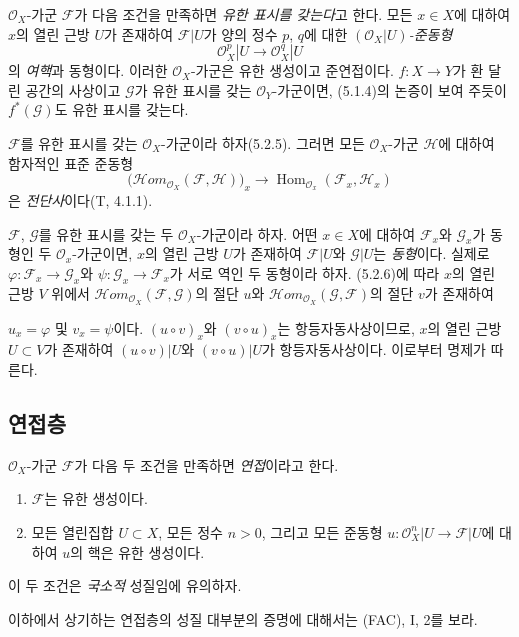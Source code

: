 \begin{env}[5.2.5]
\label{0.5.2.5-ko}
$\mathcal O_X$-가군 $\mathcal F$가 다음 조건을 만족하면
\emph{유한 표시를 갖는다}고 한다. 모든 $x\in X$에 대하여 $x$의
열린 근방 $U$가 존재하여 $\mathcal F|U$가 양의 정수 $p$, $q$에 대한
\emph{$(\mathcal O_X|U)$-준동형}
\[
  \mathcal O_X^p|U\longrightarrow\mathcal O_X^q|U
\]
의 \emph{여핵}과 동형이다. 이러한 $\mathcal O_X$-가군은 유한
생성이고 준연접이다. $f:X\to Y$가 환 달린 공간의 사상이고
$\mathcal G$가 유한 표시를 갖는 $\mathcal O_Y$-가군이면,
(5.1.4)의 논증이 보여 주듯이 $f^*(\mathcal G)$도 유한 표시를 갖는다.
\end{env}

\begin{env}[5.2.6]
\label{0.5.2.6-ko}
$\mathcal F$를 유한 표시를 갖는 $\mathcal O_X$-가군이라 하자(5.2.5).
그러면 모든 $\mathcal O_X$-가군 $\mathcal H$에 대하여 함자적인 표준
준동형
\[
  \bigl(\mathcal H\!om_{\mathcal O_X}(\mathcal F,\mathcal H)\bigr)_x
  \longrightarrow
  \operatorname{Hom}_{\mathcal O_x}(\mathcal F_x,\mathcal H_x)
\]
은 \emph{전단사}이다(T, 4.1.1).
\end{env}

\begin{env}[5.2.7]
\label{0.5.2.7-ko}
$\mathcal F$, $\mathcal G$를 유한 표시를 갖는 두
$\mathcal O_X$-가군이라 하자. 어떤 $x\in X$에 대하여
$\mathcal F_x$와 $\mathcal G_x$가 동형인 두 $\mathcal O_x$-가군이면,
$x$의 열린 근방 $U$가 존재하여 $\mathcal F|U$와 $\mathcal G|U$는
\emph{동형}이다. 실제로
$\varphi:\mathcal F_x\to\mathcal G_x$와
$\psi:\mathcal G_x\to\mathcal F_x$가 서로 역인 두 동형이라 하자.
(5.2.6)에 따라 $x$의 열린 근방 $V$ 위에서
$\mathcal H\!om_{\mathcal O_X}(\mathcal F,\mathcal G)$의 절단 $u$와
$\mathcal H\!om_{\mathcal O_X}(\mathcal G,\mathcal F)$의 절단 $v$가
존재하여


$u_x=\varphi$ 및 $v_x=\psi$이다. $(u\circ v)_x$와
$(v\circ u)_x$는 항등자동사상이므로, $x$의 열린 근방
$U\subset V$가 존재하여 $(u\circ v)|U$와 $(v\circ u)|U$가
항등자동사상이다. 이로부터 명제가 따른다.
\end{env}

\subsection{연접층}
\label{subsection:0.5.3-ko}

\begin{env}[5.3.1]
\label{0.5.3.1-ko}
$\mathcal O_X$-가군 $\mathcal F$가 다음 두 조건을 만족하면
\emph{연접}이라고 한다.
\begin{enumerate}
  \item[$a)$] $\mathcal F$는 유한 생성이다.
  \item[$b)$] 모든 열린집합 $U\subset X$, 모든 정수 $n>0$, 그리고
    모든 준동형
    $u:\mathcal O_X^n|U\to\mathcal F|U$에 대하여 $u$의 핵은 유한
    생성이다.
\end{enumerate}
이 두 조건은 \emph{국소적} 성질임에 유의하자.

이하에서 상기하는 연접층의 성질 대부분의 증명에 대해서는
(FAC), I, 2를 보라.
\end{env}

